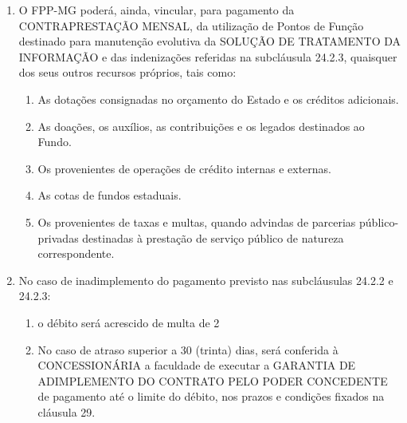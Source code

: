 \documentclass[a4paper,11pt]{report} %
\begin{document}
\begin{enumerate}
\item \label{itm:48WG} O FPP-MG poderá, ainda, vincular, para pagamento da CONTRAPRESTAÇÃO MENSAL, da utilização de Pontos de Função destinado para manutenção evolutiva da SOLUÇÃO DE TRATAMENTO DA INFORMAÇÃO e das indenizações referidas na subcláusula 24.2.3, quaisquer dos seus outros recursos próprios, tais como: 

\begin{enumerate}[label*=\arabic*.]
\item \label{itm:ANMZ} As dotações consignadas no orçamento do Estado e os créditos adicionais.

\item \label{itm:XB8K} As doações, os auxílios, as contribuições e os legados destinados ao Fundo.

\item \label{itm:G7G7} Os provenientes de operações de crédito internas e externas.

\item \label{itm:T7Z6} As cotas de fundos estaduais.

\item \label{itm:ZRZ4} Os provenientes de taxas e multas, quando advindas de parcerias público-privadas destinadas à prestação de serviço público de natureza correspondente.
\end{enumerate}

\item \label{itm:265W} No caso de inadimplemento do pagamento previsto nas subcláusulas 24.2.2 e 24.2.3:

\begin{enumerate}[label*=\arabic*.]
\item \label{itm:2WMU} o débito será acrescido de multa de 2%

\item \label{itm:LSWR} No caso de atraso superior a 30 (trinta) dias, será conferida à CONCESSIONÁRIA a faculdade de executar a GARANTIA DE ADIMPLEMENTO DO CONTRATO PELO PODER CONCEDENTE de pagamento até o limite do débito, nos prazos e condições fixados na cláusula 29.
\end{enumerate}


\end{enumerate}
\end{document}
